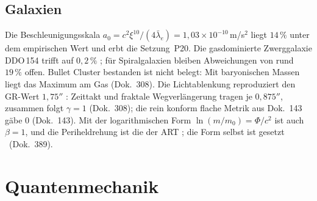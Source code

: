 \subsection{Galaxien}

Die Beschleunigungsskala $a_0=c^2\xi^{10}/(4\bar\lambda_e)=1{,}03\times10^{-10}$\,m/s$^2$ liegt
$14\,\%$ unter dem empirischen Wert und erbt die Setzung~P20. Die gasdominierte Zwerggalaxie
DDO\,154 trifft auf $0{,}2\,\%$ \KM; für Spiralgalaxien bleiben Abweichungen von rund $19\,\%$
offen. \glqq Bullet Cluster bestanden\grqq{} ist nicht belegt: Mit baryonischen Massen liegt das
Maximum am Gas (Dok.~308). Die Lichtablenkung reproduziert den GR-Wert $1{,}75''$ \KM:
Zeittakt und fraktale Wegverlängerung tragen je $0{,}875''$, zusammen folgt $\gamma=1$ (Dok.~308);
die rein konform flache Metrik aus Dok.~143 gäbe $0$ (Dok.~143). Mit der logarithmischen Form
$\ln(m/m_0)=\Phi/c^2$ ist auch $\beta=1$, und die Periheldrehung ist die der ART \KM; die Form
selbst ist gesetzt \SM\ (Dok.~389).

\section{Quantenmechanik}

